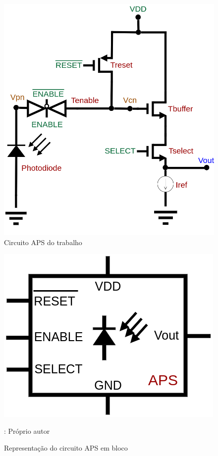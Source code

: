 \begin{figure}[htb]
	\caption{\label{fig_APS}Circuito APS do trabalho}
	\begin{center}
	    \includegraphics[scale=0.3]{Circuitos/APS.png}
	\end{center}
\end{figure}

\begin{figure}[htb]
	\caption{\label{fig_APS_block}Representa{\c c}\~ao do circuito APS em bloco}
	\begin{center}
	    \includegraphics[scale=0.5]{Circuitos/APS_block.png}
	\end{center}
	: Pr\'oprio autor
\end{figure}

